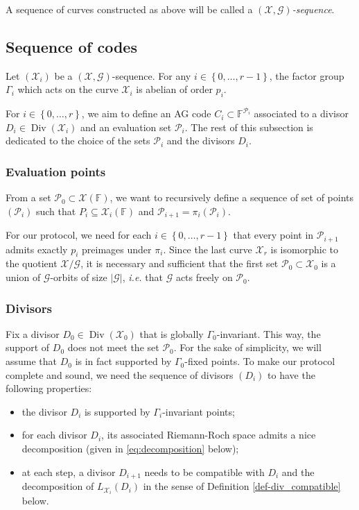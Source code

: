 \documentclass[a4paper,USenglish,autoref]{lipics-v2021}
\newcommand\F{\mathbb{F}}
\DeclareMathOperator{\Div}{Div}
\renewcommand{\vec}[1]{\boldsymbol{#1}}
\newcommand{\set}[1]{\left\{#1\right\}}
\newcommand{\size}[1]{\left|#1\right|}
\newcommand{\range}[1]{\set{0,\dots,#1-1}}
\newcommand\calX{\mathcal{X}}
\newcommand\calP{\mathcal{P}}
\newcommand\calG{\mathcal{G}}
\newcommand\XGseq{(\calX, \vec{\calG})}
\begin{document}
\begin{definition}
	A sequence of curves constructed as above will be called a \emph{$\XGseq$-sequence}.
\end{definition}

\subsection{Sequence of codes}\label{subsubsec:def-codes}

Let $(\calX_i)$ be a $\XGseq$-sequence. For any $i \in \range{r}$, the factor group $\Gamma_i$ which acts on the curve $\calX_i$ is abelian of order $p_i$.

For $i \in \set{0, \dots, r}$, we aim to define an AG code $C_i \subset \F^{\calP_i}$ associated to a divisor $D_i \in \Div(\calX_i)$ and an evaluation set $\calP_i$. 
The rest of this subsection is dedicated to the choice of the sets $\calP_i$ and the divisors $D_i$.

\subsubsection{Evaluation points} From a set $\calP_0 \subset \calX(\F)$, we want to recursively define a sequence of set of points $(\calP_i)$ such that $P_i \subseteq \calX_i(\F)$ and $\calP_{i+1}=\pi_i(\calP_{i})$.

For our protocol, we need for each $i \in \range{r}$ that every point in $\calP_{i+1}$ admits exactly $p_i$ preimages under $\pi_i$. Since the last curve $\calX_r$ is isomorphic to the quotient $\calX / \calG$, it is necessary and sufficient that the first set $\calP_0 \subset \calX_0$ is a union of $\calG$-orbits of size $\size{\calG}$, \emph{i.e.} that $\calG$ acts freely on $\calP_0$.

\subsubsection{Divisors} Fix a divisor $D_0 \in \Div(\calX_0)$ that is globally $\Gamma_0$-invariant. This way, the support of $D_0$ does not meet the set $\calP_0$. For the sake of simplicity, we will assume that $D_0$ is in fact supported by $\Gamma_0$-fixed points. To make our protocol complete and sound, we need the sequence of divisors $(D_i)$ to have the following properties:
\begin{itemize}
    \item the divisor $D_i$ is supported by $\Gamma_i$-invariant points;
    \item for each divisor $D_i$, its associated Riemann-Roch space admits a nice decomposition (given in \eqref{eq:decomposition} below);
    \item at each step, a divisor $D_{i+1}$ needs to be compatible with $D_i$ and the decomposition of $L_{\calX_i}(D_i)$ in the sense of Definition \ref{def-div_compatible} below.
\end{itemize}
\end{document}
